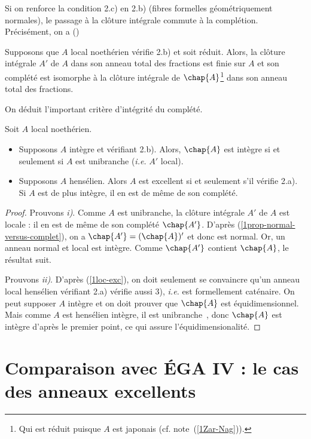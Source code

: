 \documentclass[10pt]{../fichiers-configuration-latex/smfart}
\begin{document}
Si on renforce la condition 2.c) en 2.b) (fibres formelles géométriquement normales), le passage à
la clôture intégrale commute à la complétion. Précisément, on a ()


\begin{proposition}\label{1prop-normal-versus-complet} Supposons que $A$ local noethérien vérifie
2.b) et soit réduit. Alors, la clôture intégrale $A'$ de $A$ dans son anneau total des fractions est
finie sur $A$ et son complété est isomorphe à la clôture intégrale de $\chap{A}$\footnote{Qui est
réduit puisque $A$ est japonais (cf.  note~(\ref{1Zar-Nag})).} dans son anneau total des fractions.
\end{proposition}

On déduit l'important critère d'intégrité du complété.

\begin{corollaire}\label{1-cor-normal-versus-complet} Soit $A$ local noethérien.  \begin{itemize}
\item[i)] Supposons $A$  intègre et vérifiant 2.b). Alors, $\chap{A}$ est intègre si et seulement si
$A$ est unibranche (\emph{i.e.} $A'$ local).  \item [ii)] Supposons $A$ hensélien. Alors $A$ est excellent
si et seulement s'il vérifie 2.a). Si $A$ est de plus intègre, il en est de même de son complété.
\end{itemize} \end{corollaire}

\begin{proof} Prouvons \textit{i)}. Comme $A$ est unibranche, la clôture intégrale $A'$ de $A$ est
locale : il en est de même de son complété $\chap{A'}$. D'après (\ref{1prop-normal-versus-complet}),
on a $\chap{A'}=(\chap{A})'$ et donc est normal. Or, un anneau normal et local est intègre. Comme
$\chap{A'}$ contient $\chap{A}$, le résultat suit.

Prouvons \textit{ii)}. D'après (\ref{1loc-exc}), on doit seulement se convaincre qu'un anneau local
hensélien vérifiant 2.a) vérifie aussi 3), \emph{i.e.} est formellement caténaire. On peut supposer $A$
intègre et on doit prouver que $\chap{A}$ est équidimensionnel. Mais comme $A$ est hensélien
intègre, il est unibranche~, donc $\chap{A}$ est intègre d'après le premier
point, ce qui assure l'équidimensionalité.\end{proof}

\section{Comparaison avec ÉGA IV : le cas des anneaux excellents}
\end{document}
